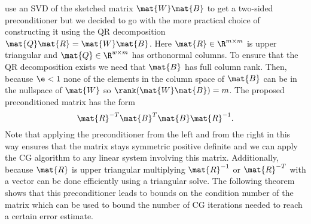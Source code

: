\Textcite{Avron-FasterRandomizedInfeasibleIPMs} use an SVD of the sketched matrix \(\mat{W}\mat{B}\) to get a two-sided preconditioner but we decided to go with the more practical choice of constructing it using the QR decomposition \(\mat{Q}\mat{R} = \mat{W}\mat{B}\).
Here \(\mat{R} \in \R^{m \times m}\) is upper triangular and \(\mat{Q} \in \R^{w \times m}\) has orthonormal columns.
To ensure that the QR decomposition exists we need that \(\mat{B}\) has full column rank. Then, because \(\e < 1\) none of the elements in the column space of \(\mat{B}\) can be in the nullspace of \(\mat{W}\) so \(\rank(\mat{W}\mat{B}) = m\).
The proposed preconditioned matrix has the form
\begin{equation}\label{eqn:preconditioned-matrix}
 \mat{R}^{-T} \mat{B}^T \mat{B} \mat{R}^{-1}.
\end{equation}
Note that applying the preconditioner from the left and from the right in this way ensures that the matrix stays symmetric positive definite and we can apply the CG algorithm to any linear system involving this matrix.
Additionally, because \(\mat{R}\) is upper triangular multiplying \(\mat{R}^{-1}\) or \(\mat{R}^{-T}\) with a vector can be done efficiently using a triangular solve.
The following theorem shows that this preconditioner leads to bounds on the condition number of the matrix which can be used to bound the number of CG iterations needed to reach a certain error estimate.

